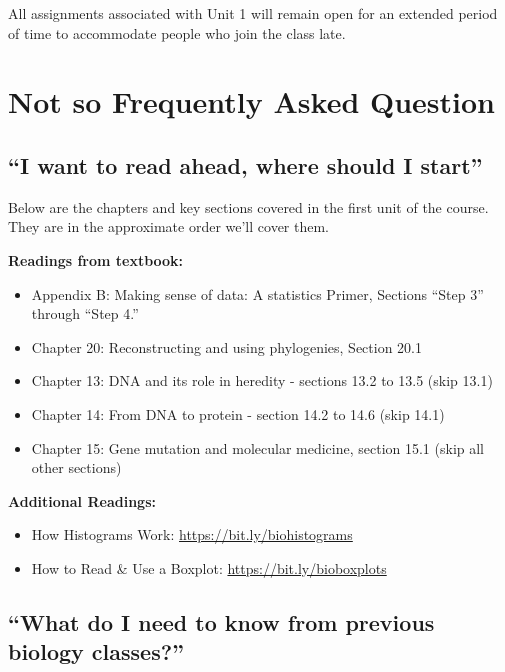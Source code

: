 \documentclass[
]{book}
\providecommand{\tightlist}{%
  \setlength{\itemsep}{0pt}\setlength{\parskip}{0pt}}
\begin{document}
All assignments associated with Unit 1 will remain open for an extended period of time to accommodate people who join the class late.

\hypertarget{not-so-frequently-asked-question}{%
\section{Not so Frequently Asked Question}\label{not-so-frequently-asked-question}}

\hypertarget{i-want-to-read-ahead-where-should-i-start}{%
\subsection{``I want to read ahead, where should I start''}\label{i-want-to-read-ahead-where-should-i-start}}

Below are the chapters and key sections covered in the first unit of the course. They are in the approximate order we'll cover them.

\textbf{Readings from textbook:}

\begin{itemize}
\tightlist
\item
  Appendix B: Making sense of data: A statistics Primer, Sections ``Step 3'' through ``Step 4.''
\item
  Chapter 20: Reconstructing and using phylogenies, Section 20.1
\item
  Chapter 13: DNA and its role in heredity - sections 13.2 to 13.5 (skip 13.1)
\item
  Chapter 14: From DNA to protein - section 14.2 to 14.6 (skip 14.1)
\item
  Chapter 15: Gene mutation and molecular medicine, section 15.1 (skip all other sections)
\end{itemize}

\textbf{Additional Readings:}

\begin{itemize}
\tightlist
\item
  How Histograms Work: \url{https://bit.ly/biohistograms}
\item
  How to Read \& Use a Boxplot: \url{https://bit.ly/bioboxplots}
\end{itemize}

\hypertarget{what-do-i-need-to-know-from-previous-biology-classes}{%
\subsection{``What do I need to know from previous biology classes?''}\label{what-do-i-need-to-know-from-previous-biology-classes}}
\end{document}
